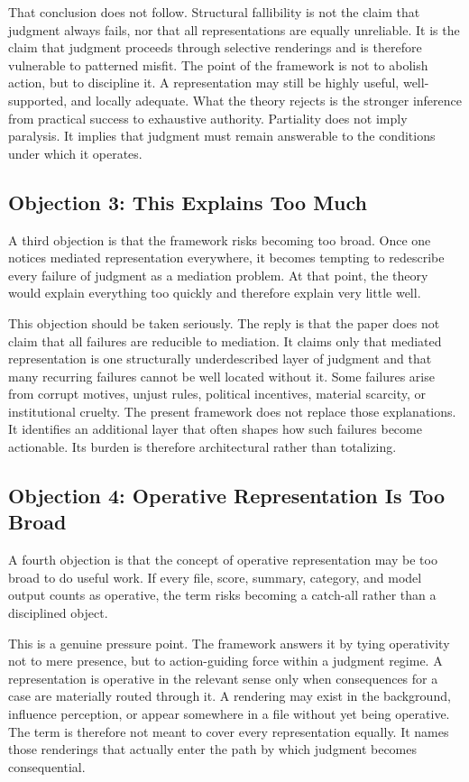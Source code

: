 \documentclass[11pt]{article}
\begin{document}
That conclusion does not follow. Structural fallibility is not the claim that judgment always fails, nor that all representations are equally unreliable. It is the claim that judgment proceeds through selective renderings and is therefore vulnerable to patterned misfit. The point of the framework is not to abolish action, but to discipline it. A representation may still be highly useful, well-supported, and locally adequate. What the theory rejects is the stronger inference from practical success to exhaustive authority. Partiality does not imply paralysis. It implies that judgment must remain answerable to the conditions under which it operates.

\subsection{Objection 3: This Explains Too Much}

A third objection is that the framework risks becoming too broad. Once one notices mediated representation everywhere, it becomes tempting to redescribe every failure of judgment as a mediation problem. At that point, the theory would explain everything too quickly and therefore explain very little well.

This objection should be taken seriously. The reply is that the paper does not claim that all failures are reducible to mediation. It claims only that mediated representation is one structurally underdescribed layer of judgment and that many recurring failures cannot be well located without it. Some failures arise from corrupt motives, unjust rules, political incentives, material scarcity, or institutional cruelty. The present framework does not replace those explanations. It identifies an additional layer that often shapes how such failures become actionable. Its burden is therefore architectural rather than totalizing.

\subsection{Objection 4: Operative Representation Is Too Broad}

A fourth objection is that the concept of operative representation may be too broad to do useful work. If every file, score, summary, category, and model output counts as operative, the term risks becoming a catch-all rather than a disciplined object.

This is a genuine pressure point. The framework answers it by tying operativity not to mere presence, but to action-guiding force within a judgment regime. A representation is operative in the relevant sense only when consequences for a case are materially routed through it. A rendering may exist in the background, influence perception, or appear somewhere in a file without yet being operative. The term is therefore not meant to cover every representation equally. It names those renderings that actually enter the path by which judgment becomes consequential.
\end{document}
